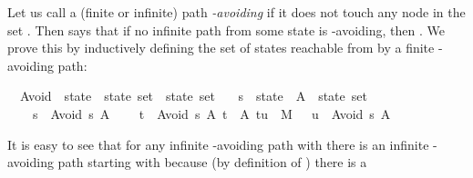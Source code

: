 \begin{isabellebody}
\begin{isamarkuptext}
Let us call a (finite or infinite) path \emph{-avoiding} if it does
not touch any node in the set . Then  says
that if no infinite path from some state  is -avoiding,
then . We prove this by inductively defining the set
 of states reachable from  by a finite -avoiding path:
\end{isamarkuptext}%
\isamarkuptrue%
\isamarkupfalse%
\isanewline
\ \ Avoid\ {}{}\ {}state\ {}\ state\ set\ {}\ state\ set{}\isanewline
\ \ \ s\ {}{}\ state\ \ A\ {}{}\ {}state\ set{}\isanewline
{}\isanewline
\ \ \ \ {}s\ {}\ Avoid\ s\ A{}\isanewline
\ \ {}\ {}{}\ t\ {}\ Avoid\ s\ A{}\ t\ {}\ A{}\ {}t{}u{}\ {}\ M\ {}\ {}\ u\ {}\ Avoid\ s\ A{}%
\begin{isamarkuptext}%
It is easy to see that for any infinite -avoiding path 
with  there is an infinite -avoiding path
starting with  because (by definition of ) there is a

\end{isamarkuptext}
\end{isabellebody}
